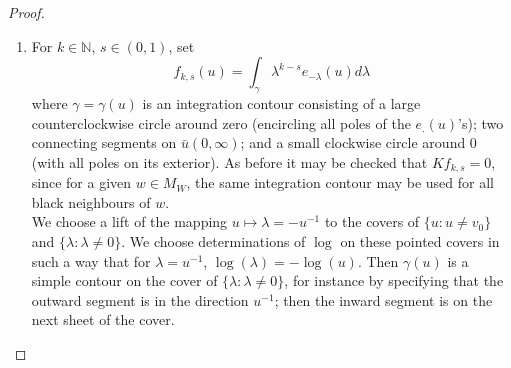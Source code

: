 \documentclass[10pt]{article}
\newcommand{\N}{\mathbb{N}}
\newcommand{\eps}{\varepsilon}
\newcommand{\dg}{\dagger}
\begin{document}
\begin{proof}
\begin{enumerate}
For small $\lambda$ we have
$$e_\lambda(u)=\exp(\lambda u+O(|u\lambda^3|+|\lambda^2|))$$
and for large $\lambda$
%
$$e_\lambda(u)=-\frac{\epsilon}{\lambda(x_0-v_0)}\exp(4\frac{\bar u}{\lambda}+O(|u\lambda^{-3}|+|\lambda^{-2}|)$$
%
where $\epsilon=1$ on $\Gamma$ and $\epsilon=-1$ on $\Gamma^\dg$ (see A.1 in  \cite{SmiChe_isoradial}). (Notice that $\frac{1+\eps}{1-\eps}=\exp(2\eps+O(\eps^3))$). The asymptotic expansion comes from small values of $\lambda$ (say $|\lambda|\leq1/\sqrt{|u|}$) and large values (say $|\lambda|\geq\sqrt{|u|}$). The intermediate values of $\lambda$ contribute to an exponentially small error in the asymptotic analysis. We have
\begin{align*}
\int_0^{\bar u\infty}\lambda^{-s} \exp(-\lambda u)d\lambda&=\Gamma(1-s)u^{s-1}\\
\int_0^{\bar u\infty}\lambda^{-s}\left(\frac{\epsilon}{\lambda(x_0-v_0)} \exp(-4\bar u\lambda^{-1})\right)d\lambda
&=\frac\epsilon{x_0-v_0}\Gamma(s)(4\bar u)^{-s}
\end{align*}
The error terms are estimated via
$$\int_0^{1/\sqrt{|u|}}t^{-s}\exp(-|u|t)O(|u|t^3+t^2)dt=\int_0^{\sqrt{|u|}}t^{-s}\exp(-t)O(t^3+t^2)\frac{dt}{|u|^{3-s}}=O(|u|^{s-3})$$
and similarly for the other integral. This shows in particular that $f_s$ is not identically zero. We then obtain $f_\chi$ by multiplying by a constant and applying a gauge transformation (recall \eqref{eq:Kastgauge}).

\item For $k\in\N$, $s\in (0,1)$, set 
$$f_{k,s}(u)=\int_\gamma \lambda^{k-s} e_{-\lambda}(u)d\lambda$$
where $\gamma=\gamma(u)$ is an integration contour consisting of a large counterclockwise circle around zero (encircling all poles of the $e_.(u)$'s); two connecting segments on $\bar u(0,\infty)$; and a small clockwise circle around 0 (with all poles on its exterior). As before it may be checked that $Kf_{k,s}=0$, since for a given $w\in M_W$, the same integration contour may be used for all black neighbours of $w$.\\
%
%
We choose a lift of the mapping $u\mapsto\lambda=-u^{-1}$ to the covers of $\{u:u\neq v_0\}$ and $\{\lambda:\lambda\neq 0\}$. We choose determinations of $\log$ on these pointed covers in such a way that for $\lambda=u^{-1}$, $\log(\lambda)=-\log(u)$.
Then $\gamma(u)$ is a simple contour on the cover of $\{\lambda:\lambda\neq 0\}$, for instance by specifying that the outward segment is in the direction $u^{-1}$; then the inward segment is on the next sheet of the cover.  


\end{enumerate}
\end{proof}
\end{document}
